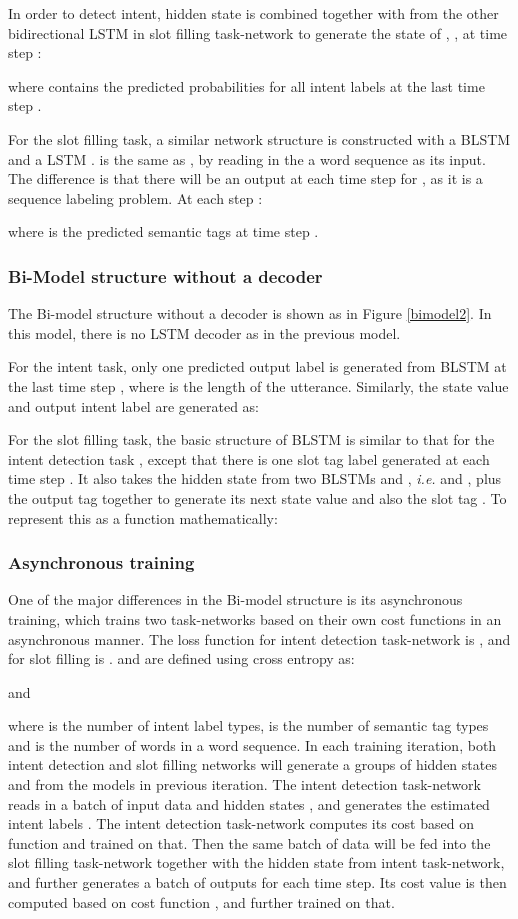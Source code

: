\documentclass[11pt,a4paper]{article}
\begin{document}
In order to detect intent, hidden state  is combined together with  from the other bidirectional LSTM  in slot filling task-network to generate the state of , , at time step :

where  contains the predicted probabilities for all intent labels at the last time step .

For the slot filling task, a similar network structure is constructed with a BLSTM  and a LSTM .  is the same as , by reading in the a word sequence as its input. The difference is that there will be an output  at each time step  for , as it is a sequence labeling problem. At each step :

where  is the predicted semantic tags at time step .
\subsubsection{Bi-Model structure without a decoder}
The Bi-model structure without a decoder is shown as in Figure \ref{bimodel2}. In this model, there is no LSTM decoder as in the previous model. 

For the intent task, only one predicted output label  is generated from BLSTM  at the last time step , where  is the length of the utterance. Similarly, the state value  and output intent label are generated as:

For the slot filling task, the basic structure of BLSTM  is similar to that for the intent detection task , except that there is one slot tag label  generated at each time step . It also takes the hidden state from two BLSTMs  and , \emph{i.e.}  and , plus the output tag  together to generate its next state value  and also the slot tag . To represent this as a function mathematically:

\subsubsection{Asynchronous training}
One of the major differences in the Bi-model structure is its asynchronous training, which trains two task-networks based on their own cost functions in an asynchronous manner. The loss function for intent detection task-network is , and for slot filling is .  and  are defined using cross entropy as:

and 

where  is the number of intent label types,  is the number of semantic tag types and  is the number of words in a word sequence.
In each training iteration, both intent detection and slot filling networks will generate a groups of hidden states  and  from the models in previous iteration. The intent detection task-network reads in a batch of input data  and hidden states , and generates the estimated intent labels . The intent detection task-network computes its cost based on function  and trained on that. Then the same batch of data  will be fed into the slot filling task-network together with the hidden state  from intent task-network, and further generates a batch of outputs  for each time step. Its cost value is then computed based on cost function , and further trained on that.
\end{document}

